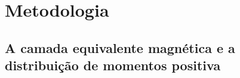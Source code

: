 \chapter{Metodologia}
\label{chap:metodologia}

\section{A camada equivalente magnética e a distribuição de momentos positiva}
\label{sec:mag_eqlayer}

